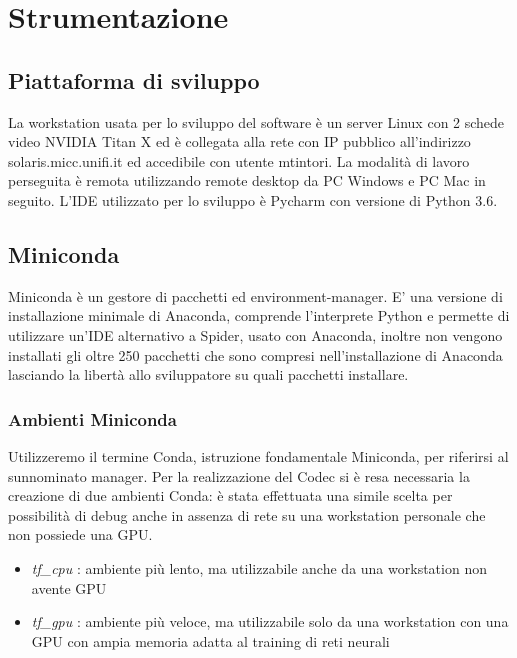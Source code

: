 \chapter{Strumentazione}
\label{chap:tools}

\section{Piattaforma di sviluppo}
\label{sec:platform}
La workstation usata per lo sviluppo del software è un server Linux con 2 schede video NVIDIA Titan X ed è collegata alla rete con IP pubblico all'indirizzo solaris.micc.unifi.it ed accedibile con utente mtintori. 
La modalità di lavoro perseguita è remota utilizzando remote desktop da PC Windows e PC Mac in seguito.
L'IDE utilizzato per lo sviluppo è Pycharm con versione di Python 3.6.

\section{Miniconda}
Miniconda è un gestore di pacchetti ed environment-manager. E' una versione di installazione minimale di Anaconda, comprende l'interprete Python e permette di utilizzare un'IDE alternativo a Spider, usato con Anaconda, inoltre non vengono installati gli oltre 250 pacchetti che sono compresi nell'installazione di Anaconda lasciando la libertà allo sviluppatore su quali pacchetti installare.
\label{sec:miniconda}
\subsection*{Ambienti Miniconda}
Utilizzeremo il termine Conda, istruzione fondamentale Miniconda, per riferirsi al sunnominato manager.
Per la realizzazione del Codec si è resa necessaria la creazione di due ambienti Conda: è stata effettuata una simile scelta per possibilità di debug anche in assenza di rete su una workstation personale che non possiede una GPU. 
\begin{itemize}
\item \emph{tf\_cpu} : ambiente più lento, ma utilizzabile anche da una workstation non avente GPU
\item \emph{tf\_gpu} : ambiente più veloce, ma utilizzabile solo da una workstation con una GPU con ampia memoria adatta al training di reti neurali
\end{itemize}
